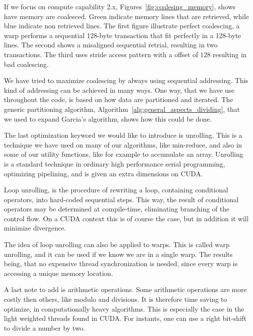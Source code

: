 If we focus on compute capability 2.x, Figures~\ref{fig:coalesing_memory}, shows have memory are coalesced. Green indicate memory lines that are retrieved, while blue indicate non retrieved lines. The first figure illustrate perfect coalescing, a warp performs a sequential 128-byte transaction that fit perfectly in a 128-byte lines. The second shows a misaligned sequential retrial, resulting in two transactions. The third uses stride access pattern with a offset of $128$ resulting in bad coalescing.

We have tried to maximize coalescing by always using sequential addressing. This kind of addressing can be achieved in many ways. One way, that we have use throughout the code, is based on how data are partitioned and iterated. The generic partitioning algorithm, Algorithm~\ref{alg:general_aspects_dividing}, that we used to expand Garcia's algorithm, shows how this could be done.     


The last optimization keyword we would like to introduce is unrolling. This is a technique we have used on many of our algorithms, like min-reduce, and also in some of our utility functions, like for example to accumulate an array. Unrolling is a standard technique in ordinary high performance serial programming, optimizing pipelining, and is given an extra dimensions on CUDA\@. 

Loop unrolling, is the procedure of rewriting a loop, containing conditional operators, into hard-coded sequential steps. This way, the result of conditional operators may be determined at compile-time, eliminating branching of the control flow. On a CUDA context this is of course the case, but in addition it will minimize divergence.

The idea of loop unrolling can also be applied to warps. This is called warp unrolling, and it can be used if we know we are in a single warp. The results being, that no expensive thread synchronization is needed, since every warp is accessing a unique memory location.

A last note to add is arithmetic operations. Some arithmetic operations are more costly then others, like modulo and divisions. It is therefore time saving to optimize, in computationally heavy algorithms. This is especially the case in the light weighted threads found in CUDA. For instants, one can use a right bit-shift to divide a number by two.


\cleardoublepage
